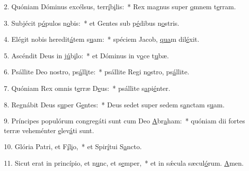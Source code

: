 2. Quóniam Dóminus excélsus, terr\uline{í}b\uline{i}lis:~* Rex magnus super \uline{o}mnem t\uline{e}rram.\par 
3. Subjécit p\uline{ó}pulos n\uline{o}bis:~* et Gentes sub p\uline{é}dibus n\uline{o}stris.\par 
4. Elégit nobis heredit\uline{á}tem s\uline{u}am:~* spéciem Jacob, \uline{qua}m dil\uline{é}xit.\par 
5. Ascéndit Deus in j\uline{ú}b\uline{i}lo:~* et Dóminus in v\uline{o}ce t\uline{u}bæ.\par 
6. Psállite Deo nostro, ps\uline{á}ll\uline{i}te:~* psállite Regi n\uline{o}stro, ps\uline{á}llite.\par 
7. Quóniam Rex omnis t\uline{e}rræ D\uline{e}us:~* psállite s\uline{a}pi\uline{é}nter.\par 
8. Regnábit Deus s\uline{u}per G\uline{e}ntes:~* Deus sedet super sedem s\uline{a}nctam s\uline{u}am.\par 
9. Príncipes populórum congregáti sunt cum Deo \uline{A}br\uline{a}ham:~* quóniam dii fortes terræ veheménter \uline{e}lev\uline{á}ti sunt.\par 
10. Glória Patri, et F\uline{í}l\uline{i}o,~* et Spir\uline{í}tui S\uline{a}ncto.\par 
11. Sicut erat in princípio, et n\uline{u}nc, et s\uline{e}mper,~* et in sǽcula sæcul\uline{ó}rum. \uline{A}men.\par 
